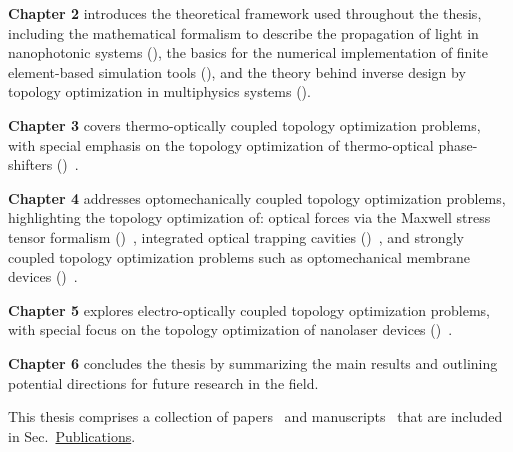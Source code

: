   \textbf{Chapter 2} introduces the theoretical framework used throughout the thesis, including the mathematical formalism
  to describe the propagation of light in nanophotonic systems (), the basics for the numerical implementation of 
  finite element-based simulation tools (), and the theory behind inverse design by topology optimization in multiphysics systems ().
  
  \textbf{Chapter 3} covers thermo-optically coupled topology optimization problems, with 
  special emphasis on the topology optimization of thermo-optical phase-shifters ()~\cite{ownpub0}.

  
  \textbf{Chapter 4} addresses optomechanically coupled topology optimization problems, highlighting the topology optimization of: optical forces via
  the Maxwell stress tensor formalism ()~\cite{ownpub2}, integrated optical trapping cavities ()~\cite{ownpub1, ownpub3}, and strongly coupled topology optimization 
  problems such as optomechanical membrane devices ()~\cite{ownpub5}.
  
  \textbf{Chapter 5} explores electro-optically coupled topology optimization problems, with special focus on the topology optimization of 
  nanolaser devices ()~\cite{ownpub4}.
  
  \textbf{Chapter 6} concludes the thesis by summarizing the main results and outlining potential directions for future research in the field.

This thesis comprises a collection of papers~\cite{ownpub0, ownpub1, ownpub2, ownpub3} and manuscripts~\cite{ownpub4, ownpub5} that
are included in Sec.~\hyperref[sec:publications]{Publications}.